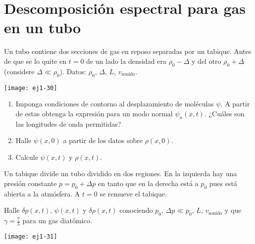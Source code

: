 \section*{Descomposición espectral para gas en un tubo}

\item
\begin{minipage}[t][1.6cm]{0.65\textwidth}
Un tubo contiene dos secciones de gas en reposo separadas por un tabique.
Antes de que se lo quite en $t=0$ de un lado la densidad era $\rho_{0}-\Delta$ y del otro $\rho_{0}+\Delta$ (considere $\Delta\ll\rho_{0}$).
Datos: $\rho_{0}$, $\Delta$, $L$, $v_\text{sonido}$.
\end{minipage}
\begin{minipage}[c][2cm][t]{0.3\textwidth}
	\texttt{[image: ej1-30]}
\end{minipage}
\begin{enumerate}
	\item Imponga condiciones de contorno al desplazamiento de moléculas $\psi$.
	A partir de estas obtenga la expresión para un modo normal $\psi_{n}(x,t)$.
	¿Cuáles son las longitudes de onda permitidas?
	\item Halle $\psi(x,0)$ a partir de los datos sobre $\rho(x,0)$.
	\item Calcule $\psi(x,t)$ y $\rho(x,t)$.
\end{enumerate}


\item
\begin{minipage}[t][2cm]{0.65\textwidth}
Un tabique divide un tubo dividido en dos regiones.
En la izquierda hay una presión constante $p = p_0 + \Delta p$ en tanto que en la derecha está a $p_0$ pues está abierta a la atmósfera.
A $t = 0$ se remueve el tabique.

Halle $\delta p(x,t)$, $\psi(x,t)$ y $\delta\rho(x,t)$ conociendo $p_0$, $\Delta p\ll p_0$, $L$, $v_\text{sonido}$ y que $\gamma= \frac{7}{5}$ para un gas diatómico.
\end{minipage}
\begin{minipage}[c][0.6cm][t]{0.3\textwidth}
	\texttt{[image: ej1-31]}
\end{minipage}


